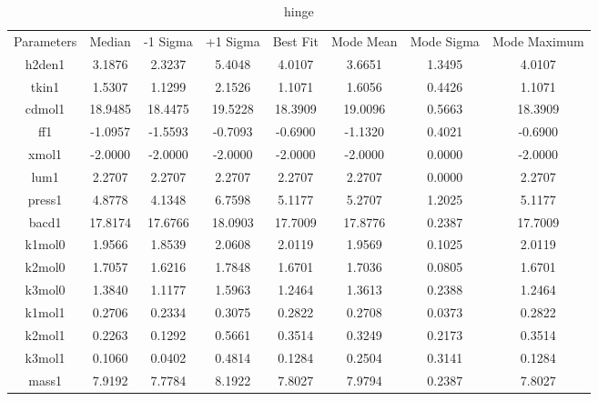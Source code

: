 \begin{table}
\caption{hinge}
\begin{tabular}{cccccccc}
Parameters & Median & -1 Sigma & +1 Sigma & Best Fit & Mode Mean & Mode Sigma & Mode Maximum \\
h2den1 & 3.1876 & 2.3237 & 5.4048 & 4.0107 & 3.6651 & 1.3495 & 4.0107 \\
tkin1 & 1.5307 & 1.1299 & 2.1526 & 1.1071 & 1.6056 & 0.4426 & 1.1071 \\
cdmol1 & 18.9485 & 18.4475 & 19.5228 & 18.3909 & 19.0096 & 0.5663 & 18.3909 \\
ff1 & -1.0957 & -1.5593 & -0.7093 & -0.6900 & -1.1320 & 0.4021 & -0.6900 \\
xmol1 & -2.0000 & -2.0000 & -2.0000 & -2.0000 & -2.0000 & 0.0000 & -2.0000 \\
lum1 & 2.2707 & 2.2707 & 2.2707 & 2.2707 & 2.2707 & 0.0000 & 2.2707 \\
press1 & 4.8778 & 4.1348 & 6.7598 & 5.1177 & 5.2707 & 1.2025 & 5.1177 \\
bacd1 & 17.8174 & 17.6766 & 18.0903 & 17.7009 & 17.8776 & 0.2387 & 17.7009 \\
k1mol0 & 1.9566 & 1.8539 & 2.0608 & 2.0119 & 1.9569 & 0.1025 & 2.0119 \\
k2mol0 & 1.7057 & 1.6216 & 1.7848 & 1.6701 & 1.7036 & 0.0805 & 1.6701 \\
k3mol0 & 1.3840 & 1.1177 & 1.5963 & 1.2464 & 1.3613 & 0.2388 & 1.2464 \\
k1mol1 & 0.2706 & 0.2334 & 0.3075 & 0.2822 & 0.2708 & 0.0373 & 0.2822 \\
k2mol1 & 0.2263 & 0.1292 & 0.5661 & 0.3514 & 0.3249 & 0.2173 & 0.3514 \\
k3mol1 & 0.1060 & 0.0402 & 0.4814 & 0.1284 & 0.2504 & 0.3141 & 0.1284 \\
mass1 & 7.9192 & 7.7784 & 8.1922 & 7.8027 & 7.9794 & 0.2387 & 7.8027 \\
\end{tabular}
\end{table}
